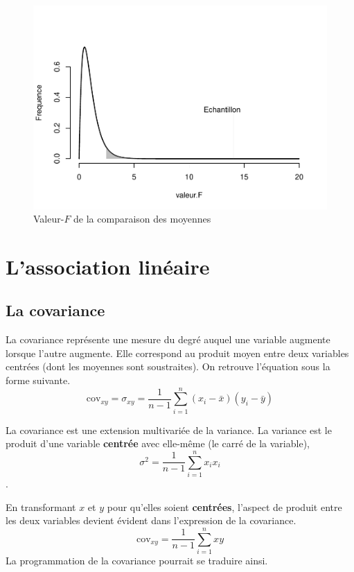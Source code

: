 \documentclass[
]{book}
\begin{document}
\begin{figure}
\centering
\includegraphics{09-Analyser_files/figure-latex/ft-1.pdf}
\caption{\label{fig:ft}Valeur-\(F\) de la comparaison des moyennes}
\end{figure}

\hypertarget{lassociation-linuxe9aire}{%
\section{L'association linéaire}\label{lassociation-linuxe9aire}}

\hypertarget{la-covariance}{%
\subsection{La covariance}\label{la-covariance}}

La covariance représente une mesure du degré auquel une variable augmente lorsque l'autre augmente. Elle correspond au produit moyen entre deux variables centrées (dont les moyennes sont soustraites). On retrouve l'équation sous la forme suivante.
\[\text{cov}_{xy} = \sigma_{xy}=\frac{1}{n-1}\sum_{i=1}^n(x_i-\bar{x})(y_i-\bar{y})\]

La covariance est une extension multivariée de la variance. La variance est le produit d'une variable \textbf{centrée} avec elle-même (le carré de la variable), \[\sigma^2=\frac{1}{n-1}\sum_{i=1}^nx_ix_i\].

En transformant \(x\) et \(y\) pour qu'elles soient \textbf{centrées}, l'aspect de produit entre les deux variables devient évident dans l'expression de la covariance.
\[\text{cov}_{xy} = \frac{1}{n-1}\sum_{i=1}^nxy\]
La programmation de la covariance pourrait se traduire ainsi.
\end{document}
